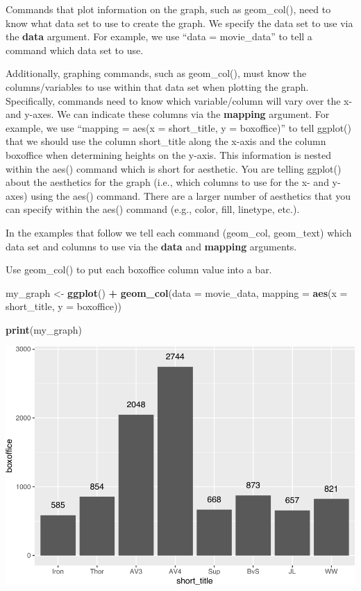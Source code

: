 \documentclass[
]{krantz}
\makeatletter
\newenvironment{Shaded}{\begin{snugshade}}{\end{snugshade}}
\newcommand{\DataTypeTok}[1]{\textcolor[rgb]{0.27,0.27,0.27}{#1}}
\newcommand{\KeywordTok}[1]{\textcolor[rgb]{0.27,0.27,0.27}{\textbf{#1}}}
\newcommand{\NormalTok}[1]{#1}
\newcommand{\OperatorTok}[1]{\textcolor[rgb]{0.43,0.43,0.43}{\textbf{#1}}}
\newcommand{\StringTok}[1]{\textcolor[rgb]{0.5,0.5,0.5}{#1}}
\newenvironment{kframe}{%
\medskip{}
\setlength{\fboxsep}{.8em}
 \def\at@end@of@kframe{}%
 \ifinner\ifhmode%
  \def\at@end@of@kframe{\end{minipage}}%
  \begin{minipage}{\columnwidth}%
 \fi\fi%
 \def\FrameCommand##1{\hskip\@totalleftmargin \hskip-\fboxsep
 \colorbox{shadecolor}{##1}\hskip-\fboxsep
     \hskip-\linewidth \hskip-\@totalleftmargin \hskip\columnwidth}%
 \MakeFramed {\advance\hsize-\width
   \@totalleftmargin\z@ \linewidth\hsize
   \@setminipage}}%
 {\par\unskip\endMakeFramed%
 \at@end@of@kframe}
\renewenvironment{Shaded}{\begin{kframe}}{\end{kframe}}
\makeatother
\begin{document}
Commands that plot information on the graph, such as geom\_col(), need to know what data set to use to create the graph. We specify the data set to use via the \textbf{data} argument. For example, we use ``data = movie\_data'' to tell a command which data set to use.

Additionally, graphing commands, such as geom\_col(), must know the columns/variables to use within that data set when plotting the graph. Specifically, commands need to know which variable/column will vary over the x- and y-axes. We can indicate these columns via the \textbf{mapping} argument. For example, we use ``mapping = aes(x = short\_title, y = boxoffice)'' to tell ggplot() that we should use the column short\_title along the x-axis and the column boxoffice when determining heights on the y-axis. This information is nested within the aes() command which is short for aesthetic. You are telling ggplot() about the aesthetics for the graph (i.e., which columns to use for the x- and y-axes) using the aes() command. There are a larger number of aesthetics that you can specify within the aes() command (e.g., color, fill, linetype, etc.).

In the examples that follow we tell each command (geom\_col, geom\_text) which data set and columns to use via the \textbf{data} and \textbf{mapping} arguments.

Use geom\_col() to put each boxoffice column value into a bar.

\begin{Shaded}
\begin{Highlighting}[]
\NormalTok{my_graph <-}\StringTok{ }\KeywordTok{ggplot}\NormalTok{() }\OperatorTok{+}
\StringTok{  }\KeywordTok{geom_col}\NormalTok{(}\DataTypeTok{data =}\NormalTok{ movie_data,}
           \DataTypeTok{mapping =} \KeywordTok{aes}\NormalTok{(}\DataTypeTok{x =}\NormalTok{ short_title, }
                         \DataTypeTok{y =}\NormalTok{ boxoffice))}

\KeywordTok{print}\NormalTok{(my_graph)}
\end{Highlighting}
\end{Shaded}

\includegraphics[width=0.65\linewidth]{bookdown_files/figure-latex/unnamed-chunk-108-1}
\end{document}
